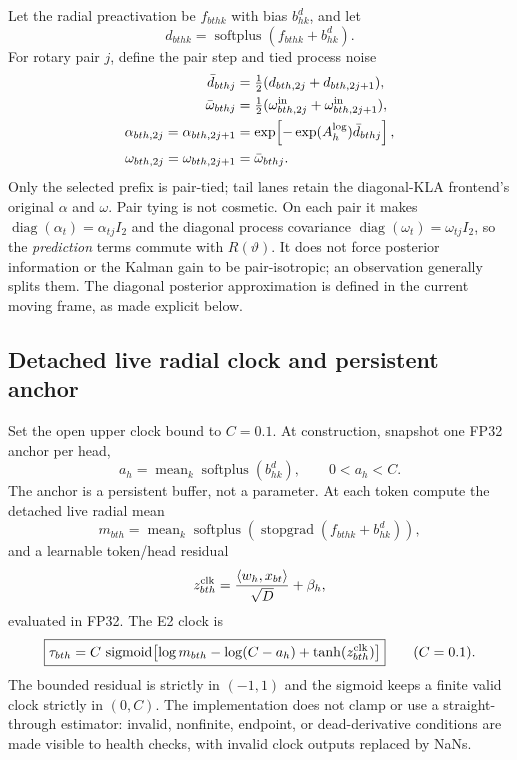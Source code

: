\documentclass[11pt]{article}
\newcommand{\sg}{\operatorname{sigmoid}}
\newcommand{\splus}{\operatorname{softplus}}
\newcommand{\detach}{\operatorname{stopgrad}}
\newcommand{\mean}{\operatorname{mean}}
\newcommand{\diag}{\operatorname{diag}}
\begin{document}
Let the radial preactivation be $f_{bthk}$ with bias $b^d_{hk}$, and let
\begin{equation}
  d_{bthk}=\splus(f_{bthk}+b^d_{hk}).
\end{equation}
For rotary pair $j$, define the pair step and tied process noise
\begin{align}
  \bar d_{bthj}
    &=\tfrac12(d_{bth,2j}+d_{bth,2j+1}),\\
  \bar\omega_{bthj}
    &=\tfrac12(\omega^{\rm in}_{bth,2j}+\omega^{\rm in}_{bth,2j+1}),\\
  \alpha_{bth,2j}=\alpha_{bth,2j+1}
    &=\exp\!\left[-\exp(A^{\log}_h)\bar d_{bthj}\right],\\
  \omega_{bth,2j}=\omega_{bth,2j+1}&=\bar\omega_{bthj}.
  \label{eq:pair-radial}
\end{align}
Only the selected prefix is pair-tied; tail lanes retain the diagonal-KLA frontend's original
$\alpha$ and $\omega$.  Pair tying is not cosmetic.  On each pair it makes
$\diag(\alpha_t)=\alpha_{tj}I_2$ and the diagonal process covariance
$\diag(\omega_t)=\omega_{tj}I_2$, so the \emph{prediction} terms commute with
$R(\vartheta)$.  It does not force posterior information or the Kalman gain to be pair-isotropic;
an observation generally splits them.  The diagonal posterior approximation is defined in the
current moving frame, as made explicit below.

\subsection{Detached live radial clock and persistent anchor}

Set the open upper clock bound to $C=0.1$.  At construction, snapshot one FP32 anchor per head,
\begin{equation}
  a_h=\mean_k\splus(b^d_{hk}),\qquad 0<a_h<C.
  \label{eq:anchor}
\end{equation}
The anchor is a persistent buffer, not a parameter.  At each token compute the detached live radial
mean
\begin{equation}
  m_{bth}=\mean_k\splus\!\left(\detach(f_{bthk}+b^d_{hk})\right),
  \label{eq:live-mean}
\end{equation}
and a learnable token/head residual
\begin{equation}
  z^{\rm clk}_{bth}=\frac{\langle w_h,x_{bt}\rangle}{\sqrt D}+\beta_h,
\end{equation}
evaluated in FP32.
The E2 clock is
\begin{equation}
  \boxed{
  \tau_{bth}=C\,\sg\!\left[
    \log m_{bth}-\log(C-a_h)+\tanh(z^{\rm clk}_{bth})
  \right]}
  \qquad(C=0.1).
  \label{eq:e2-clock}
\end{equation}
The bounded residual is strictly in $(-1,1)$ and the sigmoid keeps a finite valid clock strictly in
$(0,C)$.  The implementation does not clamp or use a straight-through estimator: invalid,
nonfinite, endpoint, or dead-derivative conditions are made visible to health checks, with invalid
clock outputs replaced by NaNs.
\end{document}
